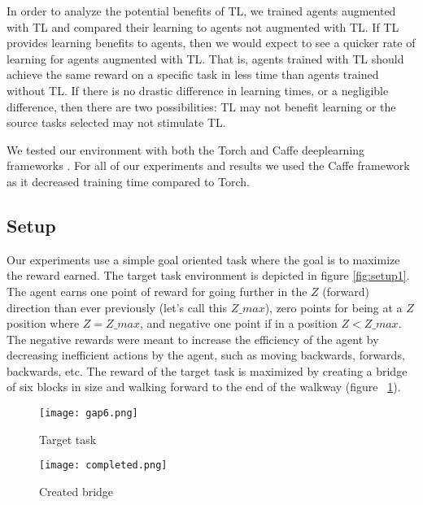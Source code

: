 \documentclass{llncs}
\begin{document}

In order to analyze the potential benefits of TL, we trained agents augmented with TL and compared their learning to agents not augmented with TL. 
If TL provides learning benefits to agents, then we would expect to see a quicker rate of learning for agents augmented with TL.
That is, agents trained with TL should achieve the same reward on a specific task in less time than agents trained without TL. 
If there is no drastic difference in learning times, or a negligible difference, then there are two possibilities: TL may not benefit learning or the source tasks selected may not stimulate TL. 

We tested our environment with both the Torch and Caffe deeplearning frameworks \citep{collobert2011torch7,jia2014caffe}. For all of our experiments and results we used the Caffe framework as it decreased training time compared to Torch. 

\subsection{Setup}\label{subsec:setup}

Our experiments use a simple goal oriented task where the goal is to maximize the reward earned. 
The target task environment is depicted in figure \ref{fig:setup1}.
The agent earns one point of reward for going further in the $Z$ (forward) direction than ever previously (let's call this $Z\_max$), zero points for being at a $Z$ position where $Z=Z\_max$, and negative one point if in a position $Z < Z\_max$.
The negative rewards were meant to increase the efficiency of the agent by decreasing inefficient actions by the agent, such as moving backwards, forwards, backwards, etc. 
The reward of the target task is maximized by creating a bridge of six blocks in size and walking forward to the end of the walkway (figure ~\ref{fig:setup2}). 

\begin{figure}[H]
  \centering
  \begin{minipage}[b]{0.45\textwidth}
    \texttt{[image: gap6.png]}
    \caption{Target task}
    \label{fig:setup1}
  \end{minipage}
  \hfill
  \begin{minipage}[b]{0.45\textwidth}
    \texttt{[image: completed.png]}
    \caption{Created bridge}
    \label{fig:setup2}
  \end{minipage}
\end{figure}
\end{document}
